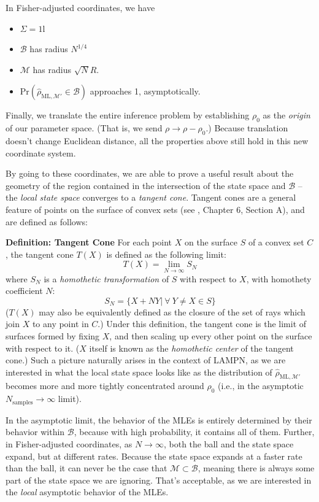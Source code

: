 \documentclass[aps,pra, twocolumn]{revtex4-1}
\newcommand{\M}{\mathcal{M}}
\newcommand{\Id}{\mathbb{I}}
\def\Id{1\!\mathrm{l}}
\newcommand{\rhohat}{\hat{\rho}}
\newcommand{\rhoML}[1]{\rhohat_{\scriptscriptstyle{\mathrm{ML},#1}}}
\begin{document}
In Fisher-adjusted coordinates, we have

 \begin{itemize}
 \item $\Sigma = \Id$
 \item $\mathcal{B}$ has radius $N^{1/4}$
 \item $\M$ has radius $\sqrt{N}R$.
 \item $\mathrm{Pr}\left(\rhoML{\M'} \in \mathcal{B}\right)$ approaches 1, asymptotically.
 \end{itemize}

Finally, we translate the entire inference problem by establishing $\rho_{0}$ as the \emph{origin} of our parameter space. (That is, we send $\rho \rightarrow \rho - \rho_{0}$.) Because translation doesn't change Euclidean distance, all the properties above still hold in this new coordinate system.

By going to these coordinates, we are able to prove a useful result about the geometry of the region contained in the intersection of the state space and $\mathcal{B}$ --  the \emph{local state space} converges to a \emph{tangent cone}. Tangent cones are a general feature of points on the surface of convex sets (see \cite{Rockafellar1998}, Chapter 6, Section A), and are defined as follows:

\textbf{Definition: Tangent Cone} 
For each point $X$ on the surface $S$ of a convex set $C$, the tangent cone $T(X)$ is defined as the following limit:
\[T(X) = \lim_{N\rightarrow \infty} S_{N}\]
where $S_{N}$ is a \emph{homothetic transformation} of $S$ with respect to $X$, with homothety coefficient $N$:
\[S_{N} = \{X + NY  |~\forall ~Y \neq X \in S\}\]
($T(X)$ may also be equivalently defined as the closure of the set of rays which join $X$ to any point in $C$.)
Under this definition, the tangent cone  is the limit of surfaces formed by fixing $X$, and then scaling up every other point on the surface with respect to it. ($X$ itself is known as the \emph{homothetic center} of the tangent cone.) Such a picture naturally arises in the context of LAMPN, as we are interested in what the local state space looks like as the distribution of $\rhoML{\M'}$ becomes more and more tightly concentrated around $\rho_{0}$ (i.e., in the asymptotic $N_{\mathrm{samples}}\rightarrow \infty$ limit).

In the asymptotic limit, the behavior of the MLEs is entirely determined by their behavior within $\mathcal{B}$, because with high probability, it contains all of them. Further, in Fisher-adjusted coordinates, as $N\rightarrow \infty$, both the ball and the state space expand, but at different rates. Because the state space expands at a faster rate than the ball, it can never be the case that $\M \subset \mathcal{B}$, meaning there is always some part of the state space we are ignoring. That's acceptable, as we are interested in the \emph{local} asymptotic behavior of the MLEs.
\end{document}
